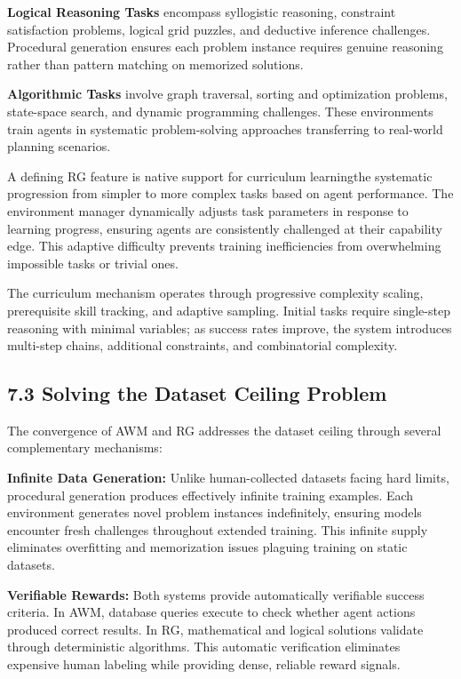 \textbf{Logical Reasoning Tasks} encompass syllogistic reasoning, constraint satisfaction problems, logical grid puzzles, and deductive inference challenges. Procedural generation ensures each problem instance requires genuine reasoning rather than pattern matching on memorized solutions.

\textbf{Algorithmic Tasks} involve graph traversal, sorting and optimization problems, state-space search, and dynamic programming challenges. These environments train agents in systematic problem-solving approaches transferring to real-world planning scenarios.

A defining RG feature is native support for curriculum learningthe systematic progression from simpler to more complex tasks based on agent performance. The environment manager dynamically adjusts task parameters in response to learning progress, ensuring agents are consistently challenged at their capability edge. This adaptive difficulty prevents training inefficiencies from overwhelming impossible tasks or trivial ones.

The curriculum mechanism operates through progressive complexity scaling, prerequisite skill tracking, and adaptive sampling. Initial tasks require single-step reasoning with minimal variables; as success rates improve, the system introduces multi-step chains, additional constraints, and combinatorial complexity.

\subsection{7.3 Solving the Dataset Ceiling Problem}

The convergence of AWM and RG addresses the dataset ceiling through several complementary mechanisms:

\textbf{Infinite Data Generation:} Unlike human-collected datasets facing hard limits, procedural generation produces effectively infinite training examples. Each environment generates novel problem instances indefinitely, ensuring models encounter fresh challenges throughout extended training. This infinite supply eliminates overfitting and memorization issues plaguing training on static datasets.

\textbf{Verifiable Rewards:} Both systems provide automatically verifiable success criteria. In AWM, database queries execute to check whether agent actions produced correct results. In RG, mathematical and logical solutions validate through deterministic algorithms. This automatic verification eliminates expensive human labeling while providing dense, reliable reward signals.

